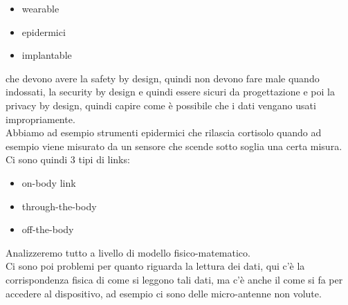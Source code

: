 \documentclass[oneside, 12pt]{extbook}
\begin{document}
\begin{itemize}
    \item wearable
    \item epidermici
    \item implantable
\end{itemize}
che devono avere la safety by design, quindi non devono fare male quando indossati, la security by design e quindi essere sicuri da progettazione e poi la privacy by design, quindi capire come è possibile che i dati vengano usati impropriamente.\\Abbiamo ad esempio strumenti epidermici che rilascia cortisolo quando ad esempio viene misurato da un sensore che scende sotto soglia una certa misura.\\Ci sono quindi 3 tipi di links:
\begin{itemize}
    \item on-body link
    \item through-the-body
    \item off-the-body
\end{itemize}
Analizzeremo tutto a livello di modello fisico-matematico.\\Ci sono poi problemi per quanto riguarda la lettura dei dati, qui c'è la corrispondenza fisica di come si leggono tali dati, ma c'è anche il come si fa per accedere al dispositivo, ad esempio ci sono delle micro-antenne non volute.
\end{document}
